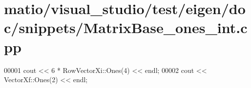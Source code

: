 \hypertarget{matio_2visual__studio_2test_2eigen_2doc_2snippets_2_matrix_base__ones__int_8cpp_source}{}\section{matio/visual\+\_\+studio/test/eigen/doc/snippets/\+Matrix\+Base\+\_\+ones\+\_\+int.cpp}
\label{matio_2visual__studio_2test_2eigen_2doc_2snippets_2_matrix_base__ones__int_8cpp_source}

\begin{DoxyCode}
00001 cout << 6 * RowVectorXi::Ones(4) << endl;
00002 cout << VectorXf::Ones(2) << endl;
\end{DoxyCode}
